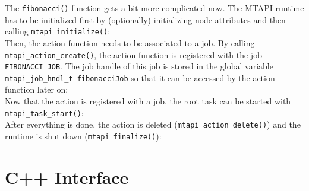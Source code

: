 The \lstinline|fibonacci()| function gets a bit more complicated now. The MTAPI runtime has to be initialized first by (optionally) initializing node attributes and then calling \lstinline|mtapi_initialize()|:
%
\\
%
Then, the action function needs to be associated to a job. By calling \lstinline|mtapi_action_create()|, the action function is registered with the job \lstinline|FIBONACCI_JOB|. The job handle of this job is stored in the global variable \lstinline|mtapi_job_hndl_t fibonacciJob| so that it can be accessed by the action function later on:
%
\\
%
Now that the action is registered with a job, the root task can be started with \lstinline|mtapi_task_start()|:
%
\\
%
After everything is done, the action is deleted (\lstinline|mtapi_action_delete()|) and the runtime is shut down (\lstinline|mtapi_finalize()|):
%
\\
%

\section{C++ Interface}
\label{sec:mtapi_cpp_interface}

